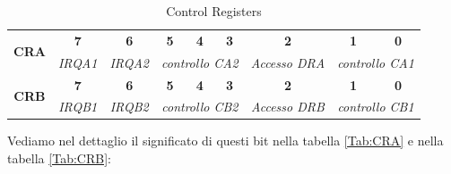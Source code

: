 \begin{table}[ht]
    \centering
    \renewcommand{\arraystretch}{1.5} %
    \setlength{\tabcolsep}{8pt} %
    \begin{tabular}{|c|c|c|c|c|c|c|c|c|}
        \hline
        \multirow{2}{*}{\textbf{CRA}} 
        & \textbf{7}  & \textbf{6}  & \textbf{5}  & \textbf{4}  & \textbf{3}  & \textbf{2}  & \textbf{1}  & \textbf{0}  \\ 
        \cline{2-9} 
        & \textit{IRQA1}  & \textit{IRQA2}  
        & \multicolumn{3}{c|}{\textit{controllo CA2}}  
        & \textit{Accesso DRA}  
        & \multicolumn{2}{c|}{\textit{controllo CA1}}  \\ 
        \hline
        \multirow{2}{*}{\textbf{CRB}}  
        & \textbf{7}  & \textbf{6}  & \textbf{5}  & \textbf{4}  & \textbf{3}  & \textbf{2}  & \textbf{1}  & \textbf{0}  \\ 
        \cline{2-9} 
        & \textit{IRQB1}  & \textit{IRQB2}  
        & \multicolumn{3}{c|}{\textit{controllo CB2}}  
        & \textit{Accesso DRB}  
        & \multicolumn{2}{c|}{\textit{controllo CB1}}  \\ 
        \hline
    \end{tabular}
    \caption{Control Registers}
    \label{Tab:control_registers}
\end{table}

Vediamo nel dettaglio il significato di questi bit nella tabella \ref{Tab:CRA} e nella tabella \ref{Tab:CRB}:
\newpage

